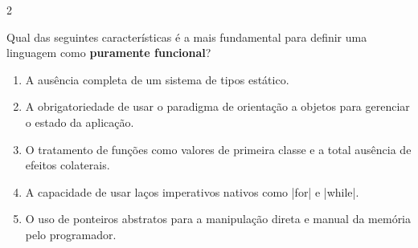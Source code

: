 \documentclass[a4paper,10pt,brazil]{article}
\begin{document}
\begin{multicols}{2}
\begin{flushright}
\end{flushright}
Qual das seguintes características é a mais fundamental para definir uma linguagem como \textbf{puramente funcional}?

\begin{enumerate}
  \item A ausência completa de um sistema de tipos estático.

  \item A obrigatoriedade de usar o paradigma de orientação a objetos para gerenciar o estado da aplicação.

  \item O tratamento de funções como valores de primeira classe e a total ausência de efeitos colaterais.

  \item A capacidade de usar laços imperativos nativos como \cinline|for| e \cinline|while|.

  \item O uso de ponteiros abstratos para a manipulação direta e manual da memória pelo programador.


\end{enumerate}


\end{multicols}
\end{document}
